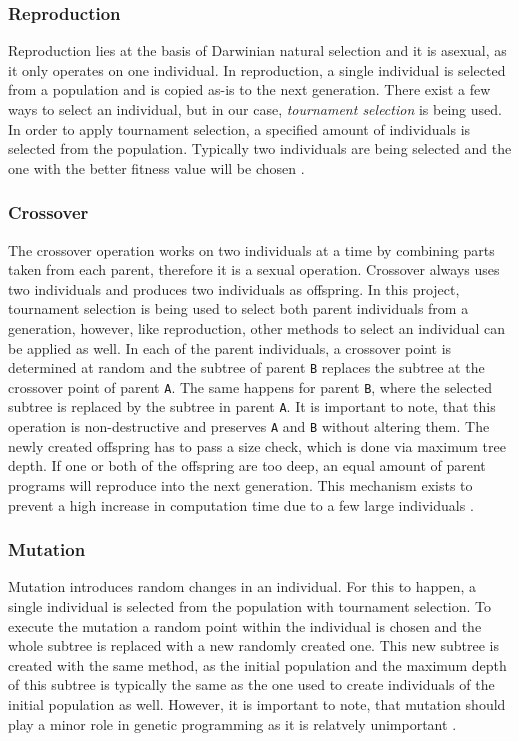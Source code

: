 \documentclass[runningheads]{llncs}
\begin{document}
\subsubsection{Reproduction}
Reproduction lies at the basis of Darwinian natural selection and it is asexual, as it only operates on one individual. In reproduction, a single individual is selected from a population and is copied as-is to the next generation. There exist a few ways to select an individual, but in our case, \emph{tournament selection} is being used. In order to apply tournament selection, a specified amount of individuals is selected from the population. Typically two individuals are being selected and the one with the better fitness value will be chosen \cite[99-100]{gp1-1993}.

\subsubsection{Crossover}
The crossover operation works on two individuals at a time by combining parts taken from each parent, therefore it is a sexual operation. Crossover always uses two individuals and produces two individuals as offspring. In this project, tournament selection is being used to select both parent individuals from a generation, however, like reproduction, other methods to select an individual can be applied as well. In each of the parent individuals, a crossover point is determined at random and the subtree of parent \texttt{B} replaces the subtree at the crossover point of parent \texttt{A}. The same happens for parent \texttt{B}, where the selected subtree is replaced by the subtree in parent \texttt{A}. It is important to note, that this operation is non-destructive and preserves \texttt{A} and \texttt{B} without altering them. The newly created offspring has to pass a size check, which is done via maximum tree depth. If one or both of the offspring are too deep, an equal amount of parent programs will reproduce into the next generation. This mechanism exists to prevent a high increase in computation time due to a few large individuals \cite[101-104]{gp1-1993}.

\subsubsection{Mutation}
Mutation introduces random changes in an individual. For this to happen, a single individual is selected from the population with tournament selection. To execute the mutation a random point within the individual is chosen and the whole subtree is replaced with a new randomly created one. This new subtree is created with the same method, as the initial population and the maximum depth of this subtree is typically the same as the one used to create individuals of the initial population as well. However, it is important to note, that mutation should play a minor role in genetic programming as it is relatvely unimportant \cite[105-106]{gp1-1993}.
\end{document}
